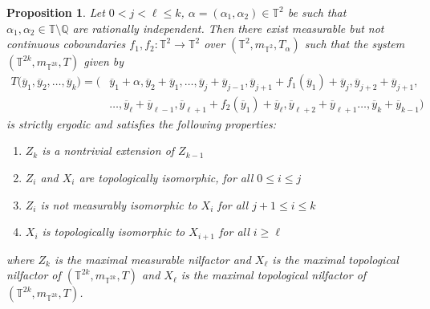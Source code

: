 \documentclass[12pt]{amsart}
\theoremstyle{definition}
\theoremstyle{plain}
\newtheorem{proposition}[theorem]{Proposition}
\theoremstyle{definition}
\numberwithin{equation}{section}
\begin{document}
  




\begin{proposition} \label{the combined proposition}
    Let $0< j < \ell \leq k$, ${\alpha}=(\alpha_1,\alpha_2) \in \mathbb{T}^{2}$ be such that $\alpha_1,\alpha_2 \in \mathbb{T} \setminus\mathbb{Q}$ are rationally independent. Then there exist measurable but not continuous coboundaries $f_1,f_2\colon\mathbb{T}^{2}\rightarrow \mathbb{T}^{2}$ over $(\mathbb{T}^2,m_{\mathbb{T}^2},T_{\alpha})$ such that the system $(\mathbb{T}^{2k},m_{\mathbb{T}^{2k}},T)$ given by 
     \begin{align*}
T\Big(\overline{y}_1,\overline{y}_2,\dots, \overline{y}_k\Big)=\Big(&\overline{y}_1+{\alpha},\overline{y}_2+\overline{y}_1,\dots,\overline{y
}_{j}+\overline{y
}_{j-1},\overline{y}_{j+1}+f_1(\overline{y}_1)+\overline{y}_{j},\overline{y}_{j+2}+\overline{y}_{j+1},\\&\dots,\overline{y}_{\ell}+\overline{y}_{\ell-1},\overline{y}_{\ell+1}+f_2(\overline{y}_1)+\overline{y}_{\ell},\overline{y}_{\ell+2}+\overline{y}_{\ell+1}\dots, \overline{y}_k+\overline{y}_{k-1}\Big)
     \end{align*}
 is strictly ergodic and satisfies the following properties:

  \begin{enumerate}
   \item $Z_k$ is a nontrivial extension of $Z_{k-1}$
      \item $Z_{i}$ and $X_{i}$ are topologically isomorphic, for all $0 \leq i \leq j$
      \item $Z_i$ is not measurably isomorphic to $X_i$ for all $j+1 \leq i \leq k$
      \item $X_i$ is topologically isomorphic to $X_{i+1}$ for all $i \geq \ell$
  \end{enumerate}
where $Z_k$ is the maximal measurable nilfactor and $X_\ell$ is the maximal topological nilfactor of $(\mathbb{T}^{2k},m_{\mathbb{T}^{2k}},T)$ and $X_\ell$ is the maximal topological nilfactor of $(\mathbb{T}^{2k},m_{\mathbb{T}^{2k}},T)$.
\end{proposition}
\end{document}

